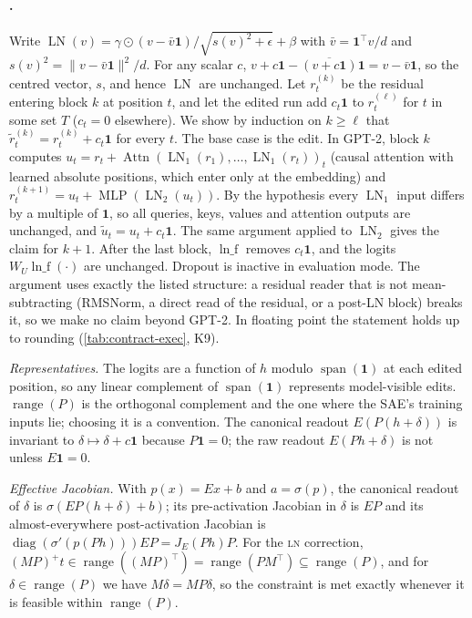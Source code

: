 \documentclass{article}
\theoremstyle{plain}
\theoremstyle{definition}
\theoremstyle{remark}
\newcommand{\LN}{\textsc{ln}}
\begin{document}
\paragraph{.}
Write $\operatorname{LN}(v) = \gamma\odot(v-\bar v\mathbf{1})/\sqrt{s(v)^2+\epsilon} + \beta$
with $\bar v = \mathbf{1}^{\top}v/d$ and $s(v)^2 = \|v - \bar v\mathbf{1}\|^2/d$. For any
scalar $c$, $v + c\mathbf{1} - \overline{(v+c\mathbf{1})}\mathbf{1} = v - \bar v\mathbf{1}$,
so the centred vector, $s$, and hence $\operatorname{LN}$ are unchanged. Let $r^{(k)}_t$ be
the residual entering block $k$ at position $t$, and let the edited run add $c_t\mathbf{1}$
to $r^{(\ell)}_t$ for $t$ in some set $T$ ($c_t = 0$ elsewhere). We show by induction on
$k\ge\ell$ that $\tilde r^{(k)}_t = r^{(k)}_t + c_t\mathbf{1}$ for every $t$. The base case is
the edit. In GPT-2, block $k$ computes
$u_t = r_t + \operatorname{Attn}(\operatorname{LN}_1(r_1),\dots,\operatorname{LN}_1(r_t))_t$
(causal attention with learned absolute positions, which enter only at the embedding) and
$r^{(k+1)}_t = u_t + \operatorname{MLP}(\operatorname{LN}_2(u_t))$. By the hypothesis every
$\operatorname{LN}_1$ input differs by a multiple of $\mathbf{1}$, so all queries, keys,
values and attention outputs are unchanged, and $\tilde u_t = u_t + c_t\mathbf{1}$. The same
argument applied to $\operatorname{LN}_2$ gives the claim for $k+1$. After the last block,
$\operatorname{ln\_f}$ removes $c_t\mathbf{1}$, and the logits $W_U\operatorname{ln\_f}(\cdot)$
are unchanged. Dropout is inactive in evaluation mode. The argument uses exactly the
listed structure: a residual reader that is not mean-subtracting (RMSNorm, a direct read of
the residual, or a post-LN block) breaks it, so we make no claim beyond GPT-2. In floating
point the statement holds up to rounding (\cref{tab:contract-exec}, K9).

\emph{Representatives.} The logits are a function of $h$ modulo $\operatorname{span}(\mathbf{1})$
at each edited position, so any linear complement of $\operatorname{span}(\mathbf{1})$
represents model-visible edits. $\operatorname{range}(P)$ is the orthogonal complement and
the one where the SAE's training inputs lie; choosing it is a convention. The canonical
readout $E(P(h+\delta))$ is invariant to $\delta\mapsto\delta+c\mathbf{1}$ because
$P\mathbf{1} = 0$; the raw readout $E(Ph+\delta)$ is not unless $E\mathbf{1} = 0$.

\emph{Effective Jacobian.} With $p(x) = Ex + b$ and $a = \sigma(p)$, the canonical readout of
$\delta$ is $\sigma(EP(h+\delta)+b)$; its pre-activation Jacobian in $\delta$ is $EP$ and its
almost-everywhere post-activation Jacobian is
$\operatorname{diag}(\sigma'(p(Ph)))EP = J_E(Ph)P$. For the \LN{} correction,
$(MP)^{+}t\in\operatorname{range}((MP)^{\top}) = \operatorname{range}(PM^{\top})
\subseteq\operatorname{range}(P)$, and for $\delta\in\operatorname{range}(P)$ we have
$M\delta = MP\delta$, so the constraint is met exactly whenever it is feasible within
$\operatorname{range}(P)$.
\end{document}
